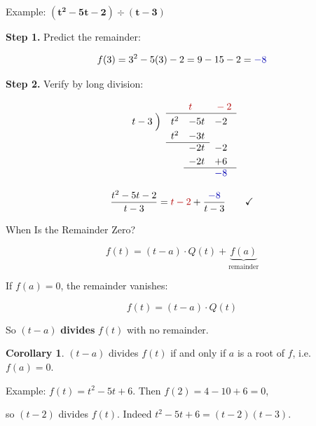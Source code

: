 \documentclass[10pt]{beamer}
\theoremstyle{definition}
\newtheorem{cor}{Corollary}[section]
\newcommand{\x}[1]{\alert{\textbf{#1}}}
\newcommand{\rd}[1]{{\color{red!70!black}#1}}
\newcommand{\bl}[1]{{\color{blue!70!black}#1}}
\begin{document}
\begin{frame}{Example: $\boldsymbol{(t^2 - 5t - 2) \div (t - 3)}$}

\x{Step 1.} Predict the remainder:

$$f(3) = 3^2 - 5(3) - 2 = 9 - 15 - 2 = \bl{-8}$$

\vfill

\x{Step 2.} Verify by long division:

$$\begin{array}{rlll}
&&{\color{red!70!black} t}&{\color{red!70!black}{}-2}\\
    \cline{2-4}
    t-3 \;\Big)& t^2 & -5t  & -2 \\[2pt]
    & t^2 & -3t &  \\
    \cline{2-3}
    &  & -2t & -2  \\[2pt]
    &   & -2t & +6  \\
    \cline{3-4}
    &   &  & {\color{blue!70!black}-8}  \\
\end{array}$$

\vfill

$$\frac{t^2 - 5t - 2}{t - 3} = \rd{t - 2} + \frac{\bl{-8}}{t - 3} \qquad \checkmark$$

\vfill
\end{frame}


\begin{frame}{When Is the Remainder Zero?}

$$f(t) = (t - a) \cdot Q(t) + \underbrace{f(a)}_{\text{remainder}}$$

\vfill

If $f(a) = 0$, the remainder vanishes:

$$f(t) = (t - a) \cdot Q(t)$$

\vfill

So $(t - a)$ \x{divides} $f(t)$ with no remainder.

\vfill

\begin{cor}
$(t - a)$ divides $f(t)$ if and only if $a$ is a root of $f$, i.e.\ $f(a) = 0$.
\end{cor}

\vfill

Example: $f(t) = t^2 - 5t + 6$. Then $f(2) = 4 - 10 + 6 = 0$,

so $(t - 2)$ divides $f(t)$. Indeed $t^2 - 5t + 6 = (t-2)(t-3)$.

\vfill
\end{frame}
\end{document}
